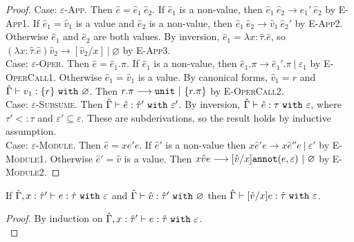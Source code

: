 \begin{appendix}
\begin{proof}
Case: \textsc{$\varepsilon$-App}. Then $\hat e = \hat e_1~\hat e_2$. If $\hat e_1$ is a non-value, then $\hat e_1~\hat e_2 \longrightarrow \hat e_1'~\hat e_2$ by \textsc{E-App1}. If $\hat e_1 = \hat v_1$ is a value and $\hat e_2$ is a non-value, then $\hat e_1~\hat e_2 \longrightarrow \hat v_1~\hat e_2'$ by \textsc{E-App2}. Otherwise $\hat e_1$ and $\hat e_2$ are both values. By inversion, $\hat e_1 = \lambda x: \hat \tau . \hat e$, so $(\lambda x: \hat \tau. \hat e) \hat v_2 \longrightarrow [\hat v_2/x]~|~\varnothing$ by \textsc{E-App3}.\\

Case: \textsc{$\varepsilon$-Oper}. Then $\hat e = \hat e_1.\pi$. If $\hat e_1$ is a non-value, then $\hat e_1.\pi \longrightarrow \hat e_1'.\pi~|~\varepsilon_1$ by \textsc{E-OperCall1}. Otherwise $\hat e_1 = \hat v_1$ is a value. By canonical forms, $\hat v_1 = r$ and $\hat \Gamma \vdash v_1: \{ r \}~\mathtt{with}~ \varnothing$. Then $r.\pi \longrightarrow \mathtt{unit}~|~\{ r.\pi \}$ by \textsc{E-OperCall2}.\\

Case: \textsc{$\varepsilon$-Subsume}. Then $\hat \Gamma \vdash \hat e: \hat \tau'~\mathtt{with}~ \varepsilon'$. By inversion, $\hat \Gamma \vdash \hat e: \tau~\mathtt{with}~ \varepsilon$, where $\tau' <: \tau$ and $\varepsilon' \subseteq \varepsilon$. These are subderivations, so the result holds by inductive assumption.\\

Case: \textsc{$\varepsilon$-Module}. Then $\hat e = {x}{\hat e'}{e}$. If $\hat e'$ is a non-value then ${x}{\hat e'}{e} \longrightarrow {x}{\hat e''}{e}~|~\varepsilon'$ by \textsc{E-Module1}. Otherwise $\hat e' = \hat v$ is a value. Then ${x}{\hat v}{e} \longrightarrow [\hat v/x]\mathtt{annot}(e, \varepsilon)~|~\varnothing$ by \textsc{E-Module2}.
\end{proof}


\hrulefill

\begin{lemma}[Substitution]
If $\hat \Gamma, x: \hat \tau' \vdash e: \hat \tau~\mathtt{with}~ \varepsilon$ and $\hat \Gamma \vdash \hat v: \hat \tau'~\mathtt{with}~ \varnothing$ then $\hat \Gamma \vdash [\hat v/x]e: \hat \tau~\mathtt{with}~ \varepsilon$.
\end{lemma}

\begin{proof} By induction on $\hat \Gamma, x: \hat \tau' \vdash e: \hat \tau~\mathtt{with}~ \varepsilon$. \\


\end{proof}
\end{appendix}
